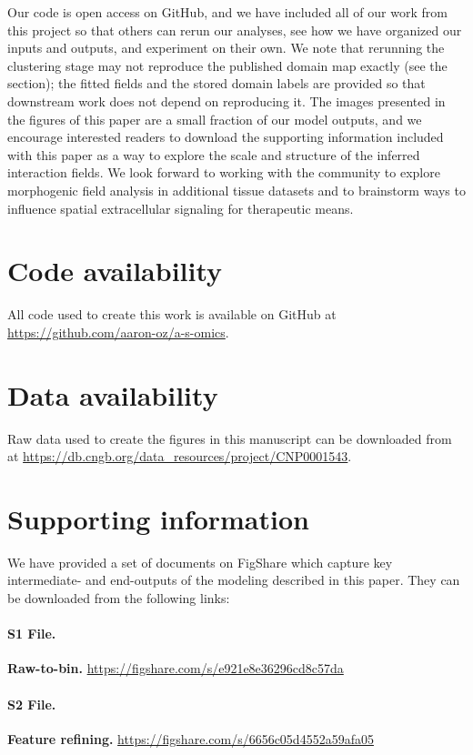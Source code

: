 \documentclass[10pt,letterpaper]{article}
\begin{document}
Our code is open access on GitHub, and we have included all of our work from this project so that others can rerun our analyses, see how we have organized our inputs and outputs, and experiment on their own. We note that rerunning the clustering stage may not reproduce the published domain map exactly (see the  section); the fitted fields and the stored domain labels are provided so that downstream work does not depend on reproducing it. The images presented in the figures of this paper are a small fraction of our model outputs, and we encourage interested readers to download the supporting information included with this paper as a way to explore the scale and structure of the inferred interaction fields. We look forward to working with the community to explore morphogenic field analysis in additional tissue datasets and to brainstorm ways to influence spatial extracellular signaling for therapeutic means.

\section*{Code availability}\label{sec:code}

All code used to create this work is available on GitHub at \url{https://github.com/aaron-oz/a-s-omics}.

\section*{Data availability}

Raw data used to create the figures in this manuscript can be downloaded from \cite{Chen2022} at \url{https://db.cngb.org/data_resources/project/CNP0001543}.

\section*{Supporting information}

We have provided a set of documents on FigShare which capture key intermediate- and end-outputs of the modeling described in this paper. They can be downloaded from the following links:

\paragraph*{S1 File.}
\label{S1_File}
\textbf{Raw-to-bin.} \url{https://figshare.com/s/e921e8e36296cd8c57da}

\paragraph*{S2 File.}
\label{S2_File}
\textbf{Feature refining.} \url{https://figshare.com/s/6656c05d4552a59afa05}
\end{document}
